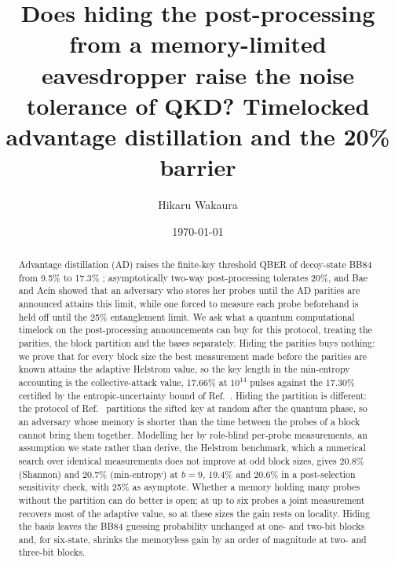 \documentclass[aps,pra,twocolumn,superscriptaddress,nofootinbib]{revtex4-2}
\begin{document}
\title{Does hiding the post-processing from a memory-limited eavesdropper raise the noise tolerance of QKD? Timelocked advantage distillation and the 20\% barrier}
\author{Hikaru Wakaura}
\date{\today}
\begin{abstract}
Advantage distillation (AD) raises the finite-key threshold QBER of decoy-state BB84 from 9.5\% to 17.3\% \cite{T25}; asymptotically two-way post-processing tolerates 20\%, and Bae and Acín showed that an adversary who stores her probes until the AD parities are announced attains this limit, while one forced to measure each probe beforehand is held off until the 25\% entanglement limit. We ask what a quantum computational timelock on the post-processing announcements can buy for this protocol, treating the parities, the block partition and the bases separately. Hiding the parities buys nothing: we prove that for every block size the best measurement made before the parities are known attains the adaptive Helstrom value, so the key length in the min-entropy accounting is the collective-attack value, 17.66\% at $10^{14}$ pulses against the 17.30\% certified by the entropic-uncertainty bound of Ref.~\cite{T25}. Hiding the partition is different: the protocol of Ref.~\cite{T25} partitions the sifted key at random after the quantum phase, so an adversary whose memory is shorter than the time between the probes of a block cannot bring them together. Modelling her by role-blind per-probe measurements, an assumption we state rather than derive, the Helstrom benchmark, which a numerical search over identical measurements does not improve at odd block sizes, gives 20.8\% (Shannon) and 20.7\% (min-entropy) at $b=9$, 19.4\% and 20.6\% in a post-selection sensitivity check, with 25\% as asymptote. Whether a memory holding many probes without the partition can do better is open; at up to six probes a joint measurement recovers most of the adaptive value, so at these sizes the gain rests on locality. Hiding the basis leaves the BB84 guessing probability unchanged at one- and two-bit blocks and, for six-state, shrinks the memoryless gain by an order of magnitude at two- and three-bit blocks.
\end{abstract}
\maketitle
\end{document}
